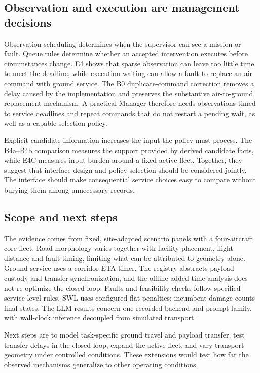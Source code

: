 \documentclass[]{interact}
\theoremstyle{plain}
\theoremstyle{definition}
\theoremstyle{remark}
\begin{document}
\subsection{Observation and execution are management decisions}

Observation scheduling determines when the supervisor can see a mission or fault. Queue rules determine whether an accepted intervention executes before circumstances change. E4 shows that sparse observation can leave too little time to meet the deadline, while execution waiting can allow a fault to replace an air command with ground service. The B0 duplicate-command correction removes a delay caused by the implementation and preserves the substantive air-to-ground replacement mechanism. A practical Manager therefore needs observations timed to service deadlines and repeat commands that do not restart a pending wait, as well as a capable selection policy.

Explicit candidate information increases the input the policy must process. The B4a--B4b comparison measures the support provided by derived candidate facts, while E4C measures input burden around a fixed active fleet. Together, they suggest that interface design and policy selection should be considered jointly. The interface should make consequential service choices easy to compare without burying them among unnecessary records.

\subsection{Scope and next steps}

The evidence comes from fixed, site-adapted scenario panels with a four-aircraft core fleet. Road morphology varies together with facility placement, flight distance and fault timing, limiting what can be attributed to geometry alone. Ground service uses a corridor ETA timer. The registry abstracts payload custody and transfer synchronization, and the offline added-time analysis does not re-optimize the closed loop. Faults and feasibility checks follow specified service-level rules. SWL uses configured flat penalties; incumbent damage counts final states. The LLM results concern one recorded backend and prompt family, with wall-clock inference decoupled from simulated transport.

Next steps are to model task-specific ground travel and payload transfer, test transfer delays in the closed loop, expand the active fleet, and vary transport geometry under controlled conditions. These extensions would test how far the observed mechanisms generalize to other operating conditions.
\end{document}

